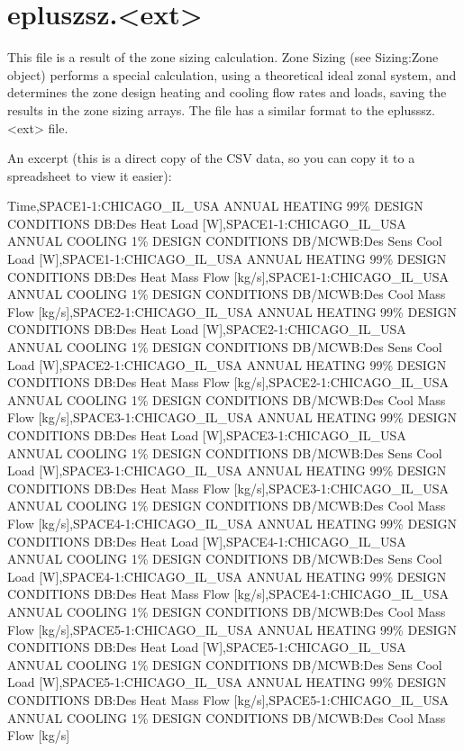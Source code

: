 \section{epluszsz.\textless{}ext\textgreater{}}\label{epluszsz.ext}

This file is a result of the zone sizing calculation. Zone Sizing (see Sizing:Zone object) performs a special calculation, using a theoretical ideal zonal system, and determines the zone design heating and cooling flow rates and loads, saving the results in the zone sizing arrays. The file has a similar format to the eplusssz.\textless{}ext\textgreater{} file.

An excerpt (this is a direct copy of the CSV data, so you can copy it to a spreadsheet to view it easier):

Time,SPACE1-1:CHICAGO\_IL\_USA ANNUAL HEATING 99\% DESIGN CONDITIONS DB:Des Heat Load {[}W{]},SPACE1-1:CHICAGO\_IL\_USA ANNUAL COOLING 1\% DESIGN CONDITIONS DB/MCWB:Des Sens Cool Load {[}W{]},SPACE1-1:CHICAGO\_IL\_USA ANNUAL HEATING 99\% DESIGN CONDITIONS DB:Des Heat Mass Flow {[}kg/s{]},SPACE1-1:CHICAGO\_IL\_USA ANNUAL COOLING 1\% DESIGN CONDITIONS DB/MCWB:Des Cool Mass Flow {[}kg/s{]},SPACE2-1:CHICAGO\_IL\_USA ANNUAL HEATING 99\% DESIGN CONDITIONS DB:Des Heat Load {[}W{]},SPACE2-1:CHICAGO\_IL\_USA ANNUAL COOLING 1\% DESIGN CONDITIONS DB/MCWB:Des Sens Cool Load {[}W{]},SPACE2-1:CHICAGO\_IL\_USA ANNUAL HEATING 99\% DESIGN CONDITIONS DB:Des Heat Mass Flow {[}kg/s{]},SPACE2-1:CHICAGO\_IL\_USA ANNUAL COOLING 1\% DESIGN CONDITIONS DB/MCWB:Des Cool Mass Flow {[}kg/s{]},SPACE3-1:CHICAGO\_IL\_USA ANNUAL HEATING 99\% DESIGN CONDITIONS DB:Des Heat Load {[}W{]},SPACE3-1:CHICAGO\_IL\_USA ANNUAL COOLING 1\% DESIGN CONDITIONS DB/MCWB:Des Sens Cool Load {[}W{]},SPACE3-1:CHICAGO\_IL\_USA ANNUAL HEATING 99\% DESIGN CONDITIONS DB:Des Heat Mass Flow {[}kg/s{]},SPACE3-1:CHICAGO\_IL\_USA ANNUAL COOLING 1\% DESIGN CONDITIONS DB/MCWB:Des Cool Mass Flow {[}kg/s{]},SPACE4-1:CHICAGO\_IL\_USA ANNUAL HEATING 99\% DESIGN CONDITIONS DB:Des Heat Load {[}W{]},SPACE4-1:CHICAGO\_IL\_USA ANNUAL COOLING 1\% DESIGN CONDITIONS DB/MCWB:Des Sens Cool Load {[}W{]},SPACE4-1:CHICAGO\_IL\_USA ANNUAL HEATING 99\% DESIGN CONDITIONS DB:Des Heat Mass Flow {[}kg/s{]},SPACE4-1:CHICAGO\_IL\_USA ANNUAL COOLING 1\% DESIGN CONDITIONS DB/MCWB:Des Cool Mass Flow {[}kg/s{]},SPACE5-1:CHICAGO\_IL\_USA ANNUAL HEATING 99\% DESIGN CONDITIONS DB:Des Heat Load {[}W{]},SPACE5-1:CHICAGO\_IL\_USA ANNUAL COOLING 1\% DESIGN CONDITIONS DB/MCWB:Des Sens Cool Load {[}W{]},SPACE5-1:CHICAGO\_IL\_USA ANNUAL HEATING 99\% DESIGN CONDITIONS DB:Des Heat Mass Flow {[}kg/s{]},SPACE5-1:CHICAGO\_IL\_USA ANNUAL COOLING 1\% DESIGN CONDITIONS DB/MCWB:Des Cool Mass Flow {[}kg/s{]}

